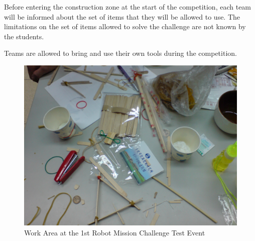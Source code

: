 \documentclass[12pt]{hurocup}
\begin{document}
\label{law-iteams-and-tools}

\begin{lawlist}[JC]

\item \label{l-items} Before entering the construction zone at the
  start of the competition, each team will be informed about the set
  of items that they will be allowed to use. The limitations on the
  set of items allowed to solve the challenge are not known by the
  students.

\item \label{l-tools} Teams are allowed to bring and use their own
  tools during the competition.
\end{lawlist}

\begin{figure}
\begin{center}
\includegraphics[width=0.8\linewidth]{Figures/junkyard_challenge_table}
\caption{Work Area at the 1st Robot Mission Challenge Test Event}
\label{fig:work-area}
\end{center}
\end{figure}
\end{document}
